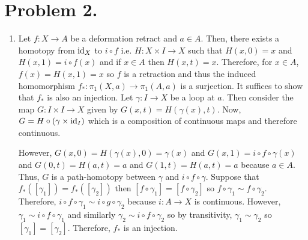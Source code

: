 \documentclass[12pt]{extarticle}
\begin{document}
\section*{Problem 2.}
\begin{enumerate}
\item Let $f : X \to A$ be a deformation retract and $a \in A$. Then, there exists a homotopy from $\mathrm{id}_X$ to $i \circ f$ i.e. $H : X \times I \to X$ such that $H(x, 0) = x$ and $H(x, 1) = i \circ f(x) $ and if $x \in A$ then $H(x, t) = x$. Therefore, for $x \in A$, $f(x) = H(x, 1) = x$ so $f$ is a retraction and thus the induced homomorphism $f_{*} : \pi_1(X, a) \to \pi_1(A, a)$ is a surjection. It suffices to show that $f_{*}$ is also an injection. Let $\gamma : I \to X$ be a loop at $a$. Then consider the map $G : I \times I \to X$ given by $G(x, t) = H(\gamma(x), t)$. Now, $G = H \circ (\gamma \times \mathrm{id}_I)$ which is a composition of continuous maps and therefore continuous.  

\begin{center}
\end{center}

However, $G(x,0) = H(\gamma(x), 0) = \gamma(x)$ and $G(x, 1) = i \circ f \circ \gamma(x)$ and $G(0, t) = H(a, t) = a$ and $G(1, t) = H(a, t) = a$ because $a \in A$. Thus, $G$ is a path-homotopy between $\gamma$ and $i \circ f \circ \gamma$. Suppose that $f_{*}([\gamma_1]) = f_{*}([\gamma_2])$ then $[f \circ \gamma_1] = [f \circ \gamma_2]$ so $f \circ \gamma_1 \sim f \circ \gamma_2$. Therefore, $i \circ f \circ \gamma_1 \sim i \circ g \circ \gamma_2$ because $i : A \to X$ is continuous. However, $\gamma_1 \sim i \circ f \circ \gamma_1$ and similarly $\gamma_2 \sim i \circ f \circ \gamma_2$ so by transitivity, $\gamma_1 \sim \gamma_2$ so $[\gamma_1] = [\gamma_2]$. Therefore, $f_{*}$ is an injection.   




\end{enumerate}
\end{document}
